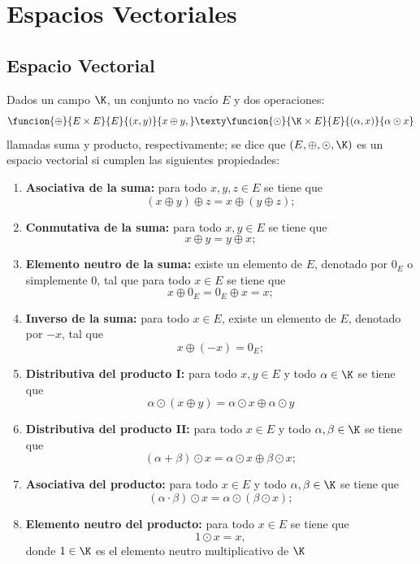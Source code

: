 \documentclass[compacto,10pt]{pubciencias-notas}
\begin{document}
\encabezado

\vspace*{-4mm}

\setcounter{section}{3}
\section{Espacios Vectoriales}
\subsection{Espacio Vectorial}

\begin{defi}
    Dados un campo $\K$, un conjunto no vacío $E$ y dos operaciones:
    \[
        \funcion{\oplus}{E\times E}{E}{(x,y)}{x\oplus y,}
        \texty
        \funcion{\odot}{\K\times E}{E}{(\alpha,x)}{\alpha\odot x}
    \]
    llamadas suma y producto, respectivamente; se dice que $(E,\oplus,\odot,\K)$ es un espacio vectorial si cumplen las siguientes propiedades:
    \begin{enumerate}
    \item \textbf{Asociativa de la suma:}
        para todo $x,y,z\in E$ se tiene que
        \[
            (x \oplus y) \oplus z = x \oplus (y \oplus z);
        \]
    \item \textbf{Conmutativa de la suma:}
        para todo $x,y\in E$ se tiene que
        \[
            x \oplus y = y \oplus x;
        \]
    \item \textbf{Elemento neutro de la suma:}
        existe un elemento de $E$, denotado por $0_E$ o simplemente $0$, tal que para todo $x\in E$ se tiene que 
        \[
            x \oplus 0_E = 0_E \oplus x = x;
        \]
    \item \textbf{Inverso de la suma:}
        para todo $x\in E$, existe un elemento de $E$, denotado por $-x$, tal que
        \[
            x \oplus (-x)= 0_E;
        \]
    \item \textbf{Distributiva del producto I:}
        para todo $x,y\in E$ y todo $\alpha\in \K$ se tiene que
        \[
            \alpha\odot (x \oplus y)=\alpha\odot x \oplus \alpha\odot y
        \]
        
    \item \textbf{Distributiva del producto II:}
        para todo $x\in E$ y todo $\alpha,\beta\in \K$ se tiene que
        \[
            (\alpha+\beta)\odot x=\alpha\odot x \oplus \beta\odot x;
        \]
    \item \textbf{Asociativa del producto:}
        para todo $x\in E$ y todo $\alpha,\beta\in \K$ se tiene que
        \[
            (\alpha\cdot \beta)\odot x=\alpha\odot(\beta\odot x);
        \]
    \item \textbf{Elemento neutro del producto:}
        para todo $x\in E$ se tiene que
        \[
            1\odot x=x,
        \]
        donde $1\in\K$ es el elemento neutro multiplicativo de $\K$
    \end{enumerate}
\end{defi}
\end{document}
